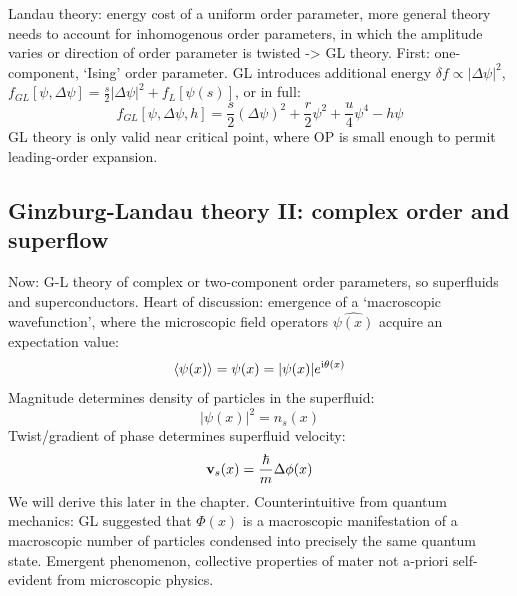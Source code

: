 \documentclass[../main.tex]{subfiles}
\begin{document}
Landau theory: energy cost of a uniform order parameter, more general theory needs to account for inhomogenous order parameters, in which the amplitude varies or direction of order parameter is twisted -> GL theory.
First: one-component, `Ising' order parameter.
GL introduces additional energy \(\delta f \propto \vert \Delta \psi \vert^2\), \(f_{GL} [\psi, \Delta \psi] = \frac{s}{2} \vert \Delta \psi \vert^2 + f_L [\psi(s)]\), or in full:
\begin{equation}
    f_{GL} [\psi, \Delta \psi, h] = \frac{s}{2} (\Delta \psi)^2 + \frac{r}{2} \psi^2 + \frac{u}{4} \psi^4 - h \psi
\end{equation}
GL theory is only valid near critical point, where OP is small enough to permit leading-order expansion.

\subsection{Ginzburg-Landau theory II: complex order and superflow}

Now: G-L theory of complex or two-component order parameters, so superfluids and superconductors.
Heart of discussion: emergence of a `macroscopic wavefunction', where the microscopic field operators \(\hat{\psi(x)}\) acquire an expectation value:
\begin{equation}
    \braket{\psi (x)} = \psi (x) = \vert \psi (x) \vert e^{\mathrm{i} \theta(x)}
\end{equation}
Magnitude determines density of particles in the superfluid:
\begin{equation}
    \vert \psi(x) \vert^2 = n_s (x)
\end{equation}
Twist/gradient of phase determines superfluid velocity:
\begin{equation}
    \bm{\mathrm{v}}_s (x) = \frac{\hbar}{m} \Delta \phi (x)
\end{equation}
We will derive this later in the chapter.
Counterintuitive from quantum mechanics: GL suggested that \(\Phi(x)\) is a macroscopic manifestation of a macroscopic number of particles condensed into precisely the same quantum state.
Emergent phenomenon, collective properties of mater not a-priori self-evident from microscopic physics.
\end{document}
